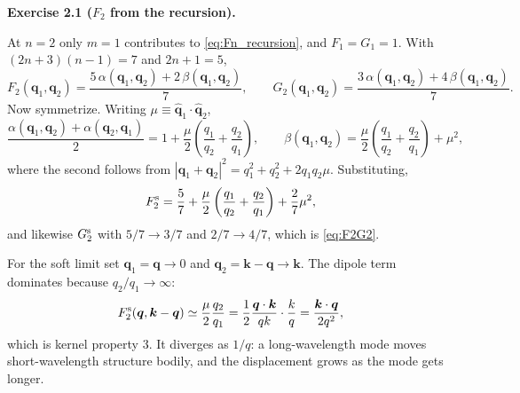 \documentclass[a4paper,11pt]{article}
\newcommand{\vq}{\bm{q}}
\newcommand{\vk}{\bm{k}}
\newenvironment{solution}[1]
  {\par\medskip\noindent\textbf{#1}\par\nobreak\smallskip}
  {\par\medskip}
\begin{document}
\begin{solution}{Exercise 2.1 ($F_2$ from the recursion).}
At $n = 2$ only $m = 1$ contributes to \eqref{eq:Fn_recursion}, and
$F_1 = G_1 = 1$. With $(2n+3)(n-1) = 7$ and $2n+1 = 5$,
\begin{equation*}
F_2(\vq_1,\vq_2) = \frac{5\,\alpha(\vq_1,\vq_2) + 2\,\beta(\vq_1,\vq_2)}{7},
\qquad
G_2(\vq_1,\vq_2) = \frac{3\,\alpha(\vq_1,\vq_2) + 4\,\beta(\vq_1,\vq_2)}{7}.
\end{equation*}
Now symmetrize. Writing $\mu \equiv \hat{\vq}_1\cdot\hat{\vq}_2$,
\begin{equation*}
\frac{\alpha(\vq_1,\vq_2)+\alpha(\vq_2,\vq_1)}{2}
= 1 + \frac{\mu}{2}\left(\frac{q_1}{q_2}+\frac{q_2}{q_1}\right),
\qquad
\beta(\vq_1,\vq_2) = \frac{\mu}{2}\left(\frac{q_1}{q_2}+\frac{q_2}{q_1}\right)
+ \mu^2 ,
\end{equation*}
where the second follows from
$|\vq_1+\vq_2|^2 = q_1^2+q_2^2+2q_1q_2\mu$. Substituting,
\begin{equation*}
F_2^{\rm s} = \frac57 + \frac{\mu}{2}\left(\frac{q_1}{q_2}+\frac{q_2}{q_1}\right)
+ \frac{2}{7}\mu^2 ,
\end{equation*}
and likewise $G_2^{\rm s}$ with $5/7 \to 3/7$ and $2/7 \to 4/7$, which is
\eqref{eq:F2G2}.

For the soft limit set $\vq_1 = \vq \to 0$ and $\vq_2 = \vk-\vq \to \vk$. The
dipole term dominates because $q_2/q_1 \to \infty$:
\begin{equation*}
F_2^{\rm s}(\vq,\vk-\vq) \simeq \frac{\mu}{2}\frac{q_2}{q_1}
= \frac{1}{2}\frac{\vq\cdot\vk}{qk}\cdot\frac{k}{q}
= \frac{\vk\cdot\vq}{2q^2} ,
\end{equation*}
which is kernel property 3. It diverges as $1/q$: a long-wavelength mode moves
short-wavelength structure bodily, and the displacement grows as the mode gets
longer.
\end{solution}
\end{document}

